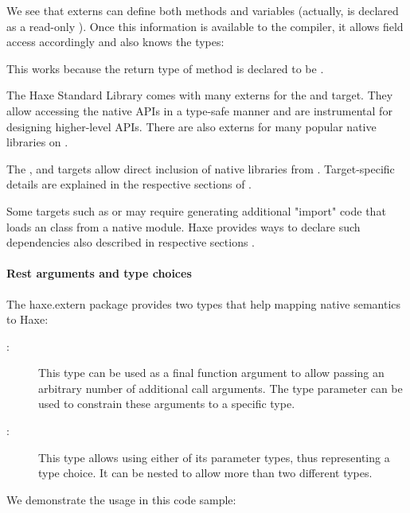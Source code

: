 We see that externs can define both methods and variables (actually,  is declared as a read-only ). Once this information is available to the compiler, it allows field access accordingly and also knows the types:


This works because the return type of method  is declared to be .

The Haxe Standard Library comes with many externs for the  and  target. They allow accessing the native APIs in a type-safe manner and are instrumental for designing higher-level APIs. There are also externs for many popular native libraries on .

The ,  and  targets allow direct inclusion of native libraries from . Target-specific details are explained in the respective sections of .

Some targets such as  or  may require generating additional "import" code that loads an  class from a native module. Haxe provides ways to declare such dependencies also described in respective sections .

\paragraph{Rest arguments and type choices}

The haxe.extern package provides two types that help mapping native semantics to Haxe:

\begin{description}
	\item[:] This type can be used as a final function argument to allow passing an arbitrary number of additional call arguments. The type parameter can be used to constrain these arguments to a specific type.
	\item[:] This type allows using either of its parameter types, thus representing a type choice. It can be nested to allow more than two different types.
\end{description}

We demonstrate the usage in this code sample:



